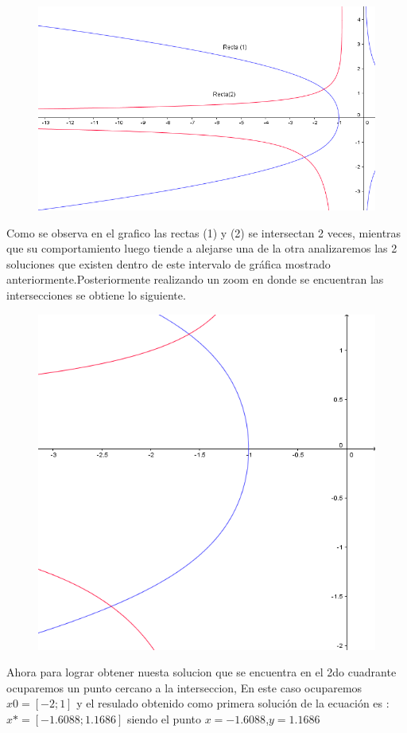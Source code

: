 \documentclass{udparticle}
\begin{document}
\begin{enumerate}
            \begin{figure}[h]
                \centering
                \includegraphics[width=15cm]{GraficoEcEj1a}
            \end{figure}
            
            Como se observa en el grafico las rectas (1) y (2) se intersectan 2 veces, mientras que su comportamiento luego tiende a alejarse una de la otra analizaremos las 2 soluciones que existen dentro de este intervalo de gráfica mostrado anteriormente.Posteriormente realizando un zoom en donde se encuentran las intersecciones se obtiene lo siguiente.\\
            
            \begin{figure}[H]
               \centering   \includegraphics[width=13cm]{GraficoEcEj1azoom}
            \end{figure}
            Ahora para lograr obtener nuesta solucion que se encuentra en el 2do cuadrante  ocuparemos un punto cercano a la interseccion, En este caso ocuparemos $ x0=[-2;1] $ y el resulado obtenido como primera solución de la ecuación es :
            $ x*=[-1.6088;1.1686 ]$ siendo el punto  $x = -1.6088$,$y = 1.1686$
            

\end{enumerate}
\end{document}
